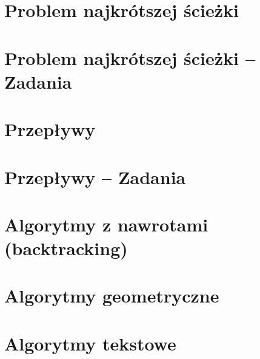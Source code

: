 \section{Problem najkrótszej ścieżki}

\section{Problem najkrótszej ścieżki -- Zadania}

\section{Przepływy}

\section{Przepływy -- Zadania}

\section{Algorytmy z nawrotami (backtracking)}

\section{Algorytmy geometryczne}

\section{Algorytmy tekstowe}


